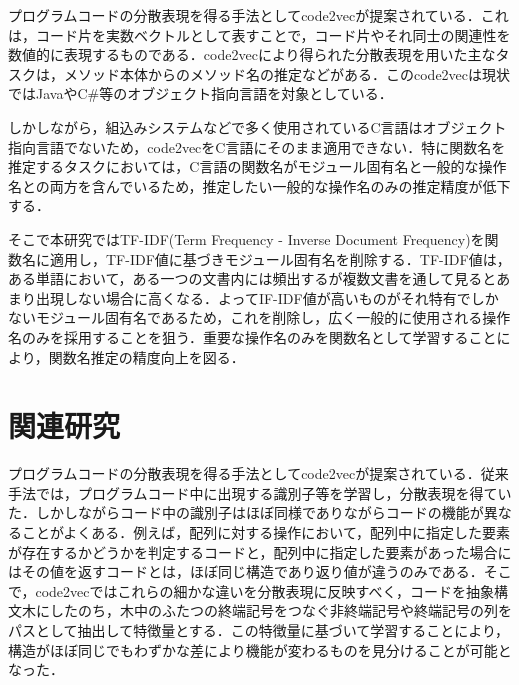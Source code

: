 \documentclass[submit,techrep,noauthor]{ipsj}
\begin{document}
プログラムコードの分散表現を得る手法としてcode2vec\cite{alon2019code2vec}が提案されている．これは，コード片を実数ベクトルとして表すことで，コード片やそれ同士の関連性を数値的に表現するものである．code2vecにより得られた分散表現を用いた主なタスクは，メソッド本体からのメソッド名の推定などがある．このcode2vecは現状ではJavaやC\#等のオブジェクト指向言語を対象としている．

しかしながら，組込みシステムなどで多く使用されているC言語はオブジェクト指向言語でないため，code2vecをC言語にそのまま適用できない．特に関数名を推定するタスクにおいては，C言語の関数名がモジュール固有名と一般的な操作名との両方を含んでいるため，推定したい一般的な操作名のみの推定精度が低下する．

そこで本研究ではTF-IDF(Term Frequency - Inverse Document Frequency)\cite{ramos2003using}を関数名に適用し，TF-IDF値に基づきモジュール固有名を削除する．TF-IDF値は，ある単語において，ある一つの文書内には頻出するが複数文書を通して見るとあまり出現しない場合に高くなる．よってIF-IDF値が高いものがそれ特有でしかないモジュール固有名であるため，これを削除し，広く一般的に使用される操作名のみを採用することを狙う．重要な操作名のみを関数名として学習することにより，関数名推定の精度向上を図る．




\section{関連研究}

プログラムコードの分散表現を得る手法としてcode2vec\cite{alon2019code2vec}が提案されている．従来手法では，プログラムコード中に出現する識別子等を学習し，分散表現を得ていた．しかしながらコード中の識別子はほぼ同様でありながらコードの機能が異なることがよくある．例えば，配列に対する操作において，配列中に指定した要素が存在するかどうかを判定するコードと，配列中に指定した要素があった場合にはその値を返すコードとは，ほぼ同じ構造であり返り値が違うのみである．そこで，code2vecではこれらの細かな違いを分散表現に反映すべく，コードを抽象構文木にしたのち，木中のふたつの終端記号をつなぐ非終端記号や終端記号の列をパスとして抽出して特徴量とする．この特徴量に基づいて学習することにより，構造がほぼ同じでもわずかな差により機能が変わるものを見分けることが可能となった．
\end{document}
